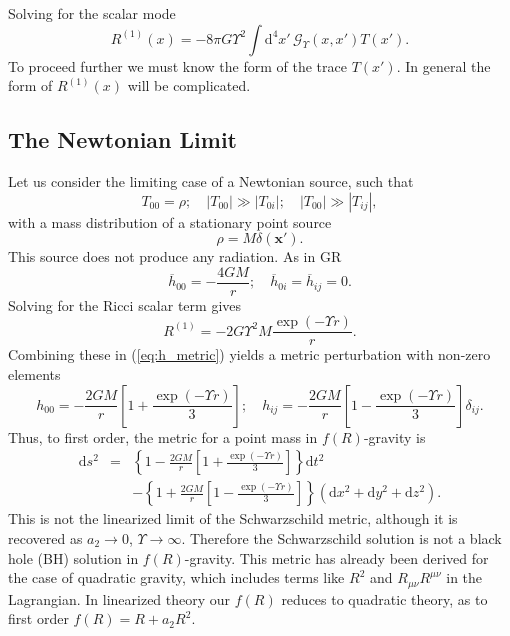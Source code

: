 \documentclass[aps,prd,reprint,showpacs]{revtex4-1}
\newcommand{\eqnref}[1]{(\ref{eq:#1})}
\newcommand{\dd}{\ensuremath{\text{d}}}
\begin{document}
Solving for the scalar mode
\begin{equation}
R^{(1)}(x) = -8 \pi G \Upsilon^2 \int \dd^4 x'\, \mathscr{G}_\Upsilon(x, x') T(x').
\end{equation}
To proceed further we must know the form of the trace $T(x')$. In general the form of $R^{(1)}(x)$ will be complicated.

\subsection{The Newtonian Limit}

Let us consider the limiting case of a Newtonian source, such that
\begin{equation}
T_{00} = \rho; \quad |T_{00}| \gg |T_{0i}|; \quad |T_{00}| \gg |T_{ij}|,
\end{equation}
with a mass distribution of a stationary point source
\begin{equation}
\rho = M\delta(\boldsymbol{x'}).
\end{equation}
This source does not produce any radiation. As in GR
\begin{equation}
\overline{h}_{00} = -\frac{4GM}{r}; \quad \overline{h}_{0i} = \overline{h}_{ij} = 0.
\end{equation}
Solving for the Ricci scalar term gives
\begin{equation}
R^{(1)} = -2 G \Upsilon^2 M \frac{\exp(- \Upsilon r)}{r}.
\end{equation}
Combining these in \eqnref{h_metric} yields a metric perturbation with non-zero elements 
\begin{equation}
h_{00} = -\frac{2GM}{r}\left[1 + \frac{\exp(- \Upsilon r)}{3}\right]; \quad h_{ij} = -\frac{2GM}{r}\left[1 - \frac{\exp(- \Upsilon r)}{3}\right]\delta_{ij}.
\end{equation}
Thus, to first order, the metric for a point mass in $f(R)$-gravity is\cite{Capozziello2009a, Naf2010}
\begin{eqnarray}
\dd s^2 & = & \left\{1-\frac{2GM}{r}\left[1 + \frac{\exp(- \Upsilon r)}{3}\right]\right\}\dd t^2 \nonumber \\
 & & - \left\{1+\frac{2GM}{r}\left[1 - \frac{\exp(- \Upsilon r)}{3}\right]\right\}\left(\dd x^2 + \dd y^2 + \dd z^2\right).
\label{eq:f(R)_Schw}
\end{eqnarray}
This is not the linearized limit of the Schwarzschild metric, although it is recovered as $a_2 \rightarrow 0$, $\Upsilon \rightarrow \infty$. Therefore the Schwarzschild solution is not a black hole (BH) solution in $f(R)$-gravity\cite{Chiba2007a}. This metric has already been derived for the case of quadratic gravity, which includes terms like $R^2$ and $R_{\mu\nu}R^{\mu\nu}$ in the Lagrangian\cite{Pechlaner1966, Stelle1978, Schmidt1986, Teyssandier1990}. In linearized theory our $f(R)$ reduces to quadratic theory, as to first order $f(R) = R + a_2 R^2$.
\end{document}
